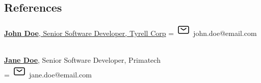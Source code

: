 \documentclass[]{plushcv}
\begin{document}
\begin{paracol}{2}

\section{References} 
\href{https://www.linkedin.com/company/john-doe/}{\textbf{John Doe}, Senior Software Developer, Tyrell Corp}
\begingroup
{}=\hbox{
\includegraphics[scale=0.5,trim={0cm 0.2cm 0cm 0cm}]{icons/main/mail.png}\hspace{0.3cm} john.doe@email.com
}
\parbox{\wd0}{}
\endgroup
\\
\sectionsep
\href{https://www.linkedin.com/company/john-doe/}{\textbf{Jane Doe}}, Senior Software Developer, Primatech 
\\
\begingroup
{}=\hbox{
\includegraphics[scale=0.5,trim={0cm 0.2cm 0cm 0cm}]{icons/main/mail.png}\hspace{0.3cm} jane.doe@email.com
}
\parbox{\wd0}{}
\endgroup
\\






\end{paracol}
\end{document}
